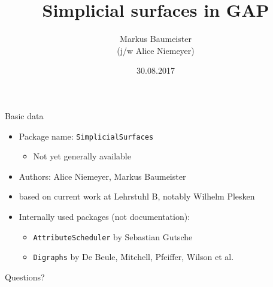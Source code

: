 \documentclass[11pt, handout]{beamer}
\author[Baumeister]{Markus Baumeister\\ \vspace{1mm} \small{(j/w Alice Niemeyer)}}
\title{Simplicial surfaces in GAP}
\institute[Aachen]{Lehrstuhl B für Mathematik\\RWTH Aachen University}
\date{30.08.2017}
\begin{document}
\begin{frame}
\titlepage
\end{frame}

\begin{frame}{Basic data}
    \begin{itemize}
        \pause
        \item Package name: \texttt{SimplicialSurfaces}
            \begin{itemize}
                \pause
                \item Not yet generally available
            \end{itemize}
        \pause
        \item Authors: Alice Niemeyer, Markus Baumeister
        \pause
        \item based on current work at Lehrstuhl B, notably Wilhelm Plesken
        \pause
        \item Internally used packages (not documentation):
            \begin{itemize}
                \pause
                \item \texttt{AttributeScheduler} by Sebastian Gutsche
                \pause
                \item \texttt{Digraphs} by De Beule, Mitchell, Pfeiffer, Wilson et al.
            \end{itemize}
    \end{itemize}
\end{frame}


\begin{frame}
    \tableofcontents[pausesections]
\end{frame}



            




\begin{frame}{Questions?}
    
\end{frame}
\end{document}
